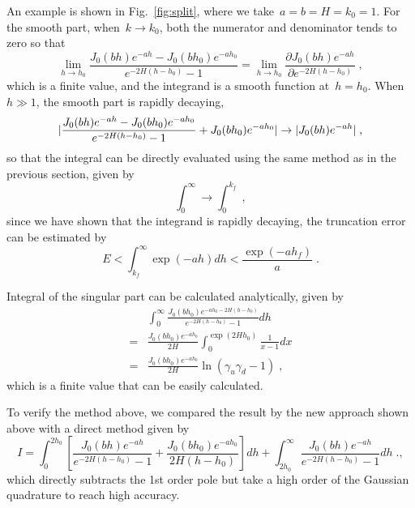 An example is shown in Fig.~\ref{fig:split}, where we take~$a = b = H = k_0 = 1$.
For the smooth part, when~$k \to k_0$, both the numerator and denominator tends to zero so that
\begin{equation}
    \lim_{h \to h_0} \frac{J_0(bh) e^{- a h} - J_0(bh_0) e^{- a h_0}}{e^{- 2 H (h - h_0)} - 1}  = \lim_{h \to h_0} \frac{ \partial {J_0(bh) e^{- a h}}}{ \partial {e^{- 2 H (h - h_0)}}}\;,
\end{equation}
which is a finite value, and the integrand is a smooth function at~$h = h_0$.
When~$h \gg 1$, the smooth part is rapidly decaying, 
\begin{equation}
    \lvert\frac{J_0(bh) e^{- a h} - J_0(bh_0) e^{- a h_0}}{e^{- 2 H (h - h_0)} - 1} + J_0(bh_0) e^{- a h_0} \rvert \to \lvert J_0(bh) e^{- a h}\rvert\;,
\end{equation}
so that the integral can be directly evaluated using the same method as in the previous section, given by
\begin{equation}
    \int_0^{\infty} \to \int_0^{k_f}\;,
\end{equation}
since we have shown that the integrand is rapidly decaying, the truncation error can be estimated by
\begin{equation}
    E < \int_{k_f}^{\infty} \exp{(-a h)} dh < \frac{\exp{(-a h_f)}}{a}\;.
\end{equation}

Integral of the singular part can be calculated analytically, given by
\begin{equation}
    \begin{split}
        & \int_0^{\infty} \frac{J_0(bh_0) e^{- a h_0 - 2 H (h - h_0)}}{e^{- 2 H (h - h_0)} - 1} dh\\
        = & \frac{J_0(bh_0) e^{- a h_0}}{2H} \int_{0}^{\exp{(2 H h_0)}} \frac{1}{x - 1} dx\\
        = & \frac{J_0(bh_0) e^{- a h_0}}{2H} \ln{(\gamma_u \gamma_d - 1)}\;,
    \end{split}
\end{equation}
which is a finite value that can be easily calculated.

To verify the method above, we compared the result by the new approach shown above with a direct method given by
\begin{equation}
        I = \int_{0}^{2 h_0} \left[\frac{J_0(bh)e^{-ah}}{e^{-2H(h-h_0)} - 1} + \frac{J_0(bh_0)e^{-ah_0}}{2H(h - h_0)}\right] dh + \int_{2 h_0}^{\infty} \frac{J_0(bh)e^{-ah}}{e^{-2H(h-h_0)} - 1} dh\;.,\label{eq:direct}
\end{equation}
which directly subtracts the 1st order pole but take a high order of the Gaussian quadrature to reach high accuracy.

